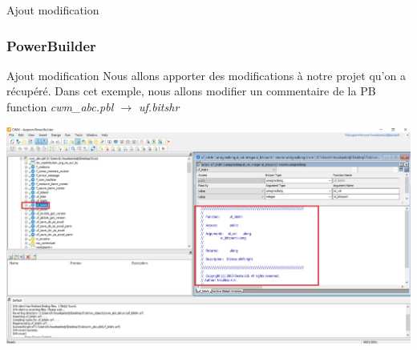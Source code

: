 \documentclass{beamer}
\begin{document}
\begin{frame}
\begin{center}
\huge{Ajout modification}
\end{center}
\end{frame}

\begin{frame}
\frametitle{PowerBuilder}
\begin{block}{Ajout modification}
Nous allons apporter des modifications à notre projet qu'on a récupéré. Dans cet exemple, nous allons modifier un commentaire de la PB function \alert{\textit{cwm\_abc.pbl $\rightarrow$ uf.bitshr}}
\end{block}
 
\includegraphics[scale=.2]{../images/modif1.jpg}
\end{frame}
\end{document}
